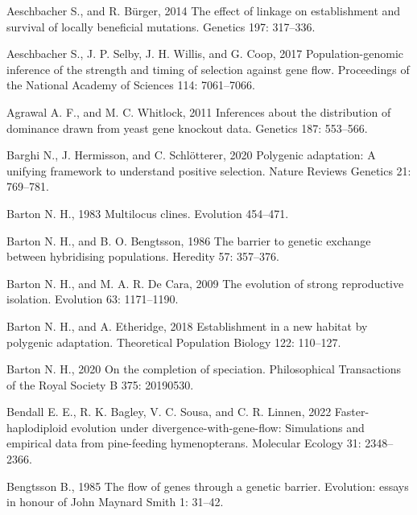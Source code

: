 \documentclass[
  11pt,
]{article}
\newlength{\cslhangindent}
\newlength{\cslentryspacingunit} %
\newenvironment{CSLReferences}[2] %
 {%
  \setlength{\parindent}{0pt}
  \ifodd #1
  \let\oldpar\par
  \def\par{\hangindent=\cslhangindent\oldpar}
  \fi
  \setlength{\parskip}{#2\cslentryspacingunit}
 }%
 {}
\begin{document}
\hypertarget{refs}{}
\begin{CSLReferences}{1}{0}
\leavevmode{}%
Aeschbacher S., and R. Bürger, 2014 The effect of linkage on
establishment and survival of locally beneficial mutations. Genetics
197: 317--336.

\leavevmode{}%
Aeschbacher S., J. P. Selby, J. H. Willis, and G. Coop, 2017
Population-genomic inference of the strength and timing of selection
against gene flow. Proceedings of the National Academy of Sciences 114:
7061--7066.

\leavevmode{}%
Agrawal A. F., and M. C. Whitlock, 2011 Inferences about the
distribution of dominance drawn from yeast gene knockout data. Genetics
187: 553--566.

\leavevmode{}%
Barghi N., J. Hermisson, and C. Schlötterer, 2020 Polygenic adaptation:
A unifying framework to understand positive selection. Nature Reviews
Genetics 21: 769--781.

\leavevmode{}%
Barton N. H., 1983 Multilocus clines. Evolution 454--471.

\leavevmode{}%
Barton N. H., and B. O. Bengtsson, 1986 The barrier to genetic exchange
between hybridising populations. Heredity 57: 357--376.

\leavevmode{}%
Barton N. H., and M. A. R. De Cara, 2009 The evolution of strong
reproductive isolation. Evolution 63: 1171--1190.

\leavevmode{}%
Barton N. H., and A. Etheridge, 2018 Establishment in a new habitat by
polygenic adaptation. Theoretical Population Biology 122: 110--127.

\leavevmode{}%
Barton N. H., 2020 On the completion of speciation. Philosophical
Transactions of the Royal Society B 375: 20190530.

\leavevmode{}%
Bendall E. E., R. K. Bagley, V. C. Sousa, and C. R. Linnen, 2022
Faster-haplodiploid evolution under divergence-with-gene-flow:
Simulations and empirical data from pine-feeding hymenopterans.
Molecular Ecology 31: 2348--2366.

\leavevmode{}%
Bengtsson B., 1985 The flow of genes through a genetic barrier.
Evolution: essays in honour of John Maynard Smith 1: 31--42.


\end{CSLReferences}
\end{document}
